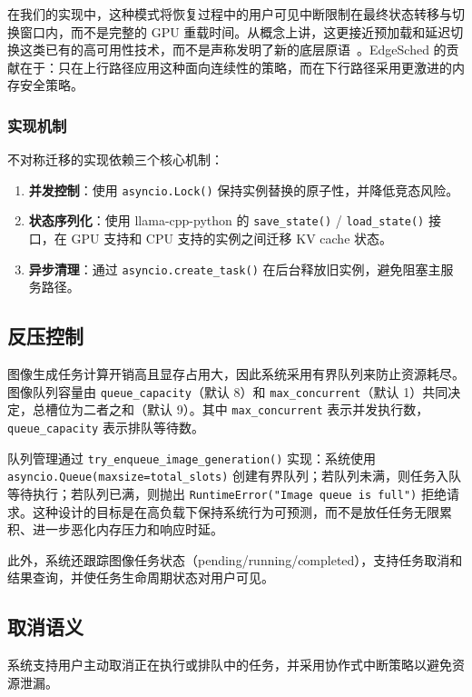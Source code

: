 在我们的实现中，这种模式将恢复过程中的用户可见中断限制在最终状态转移与切换窗口内，而不是完整的 GPU 重载时间。从概念上讲，这更接近预加载和延迟切换这类已有的高可用性技术，而不是声称发明了新的底层原语~\cite{cully2008remus}。EdgeSched 的贡献在于：只在上行路径应用这种面向连续性的策略，而在下行路径采用更激进的内存安全策略。

\subsubsection{实现机制}

不对称迁移的实现依赖三个核心机制：
\begin{enumerate}
\item \textbf{并发控制}：使用 \texttt{asyncio.Lock()} 保持实例替换的原子性，并降低竞态风险。
\item \textbf{状态序列化}：使用 llama-cpp-python 的 \texttt{save\_state()} / \texttt{load\_state()} 接口，在 GPU 支持和 CPU 支持的实例之间迁移 KV cache 状态。
\item \textbf{异步清理}：通过 \texttt{asyncio.create\_task()} 在后台释放旧实例，避免阻塞主服务路径。
\end{enumerate}

\subsection{反压控制}

图像生成任务计算开销高且显存占用大，因此系统采用有界队列来防止资源耗尽。图像队列容量由 \texttt{queue\_capacity}（默认 8）和 \texttt{max\_concurrent}（默认 1）共同决定，总槽位为二者之和（默认 9）。其中 \texttt{max\_concurrent} 表示并发执行数，\texttt{queue\_capacity} 表示排队等待数。

队列管理通过 \texttt{try\_enqueue\_image\_generation()} 实现：系统使用 \texttt{asyncio.Queue(maxsize=total\_slots)} 创建有界队列；若队列未满，则任务入队等待执行；若队列已满，则抛出 \texttt{RuntimeError("Image queue is full")} 拒绝请求。这种设计的目标是在高负载下保持系统行为可预测，而不是放任任务无限累积、进一步恶化内存压力和响应时延。

此外，系统还跟踪图像任务状态（pending/running/completed），支持任务取消和结果查询，并使任务生命周期状态对用户可见。

\subsection{取消语义}

系统支持用户主动取消正在执行或排队中的任务，并采用协作式中断策略以避免资源泄漏。

